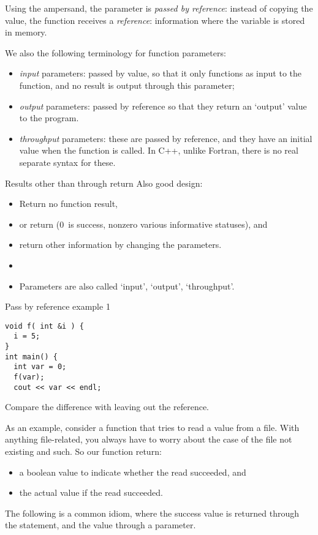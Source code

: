 Using the ampersand, the parameter is
\emph{passed by reference}:
instead of copying the value, the function receives a \emph{reference}:
information where the variable is stored in memory.

We also the following terminology for function parameters:
\begin{itemize}
\item \emph{input} parameters: passed by
  value, so that it only functions as input to the function, and no
  result is output through this parameter;
\item \emph{output} parameters: passed
  by reference so that they return an `output' value to the program.
\item \emph{throughput} parameters:
  these are passed by reference, and they have an initial value when
  the function is called. In C++, unlike Fortran, there is no real
  separate syntax for these.
\end{itemize}

\begin{slide}{Results other than through return}
  \label{sl:func-err-return}
  Also good design:
  \begin{itemize}
  \item Return no function result,
  \item or return  (0~is success, nonzero various
    informative statuses), and
  \item return other information by changing the parameters.
  \item {}
  \item Parameters are also called `input', `output', `throughput'.
  \end{itemize}
\end{slide}

\begin{block}{Pass by reference example 1}
  \label{sl:pass-reference0}
\begin{verbatim}
void f( int &i ) {
  i = 5;
}
int main() {
  int var = 0;
  f(var);
  cout << var << endl;
\end{verbatim}
Compare the difference with leaving out the reference.
\end{block}

As an example, consider a function that tries to read a value from a
file. With anything file-related, you always have to worry about the
case of the file not existing and such. So our function return:
\begin{itemize}
\item a boolean value to indicate whether the read succeeded, and
\item the actual value if the read succeeded.
\end{itemize}
The following is a common idiom, where the success value is returned
through the  statement, and the value through a parameter.

